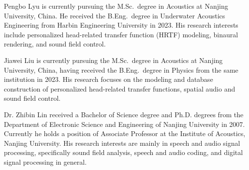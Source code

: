 \documentclass[a4paper,fleqn]{cas-dc}
\begin{document}


\printcredits

% 






Pengbo Lyu is currently pursuing the M.Sc.~degree in Acoustics at Nanjing University, China. He received the B.Eng.~degree in Underwater Acoustics Engineering from Harbin Engineering University in 2023. His research interests include personalized head-related transfer function (HRTF) modeling, binaural rendering, and sound field control.
\endbio

Jiawei Liu is currently pursuing the M.Sc.~degree in Acoustics at Nanjing University, China, having received the B.Eng.~degree in Physics from the same institution in 2023. His research focuses on the modeling and database construction of personalized head-related transfer functions, spatial audio and sound field control.
\endbio

Dr. Zhibin Lin received a Bachelor of Science degree and Ph.D. degrees from the Department of Electronic Science and Engineering of Nanjing University in 2007. Currently he holds a position of Associate Professor at the Institute of Acoustics, Nanjing University. His research interests are mainly in speech and audio signal processing, specifically sound field analysis, speech and audio coding, and digital signal processing in general. 
\endbio
\end{document}
